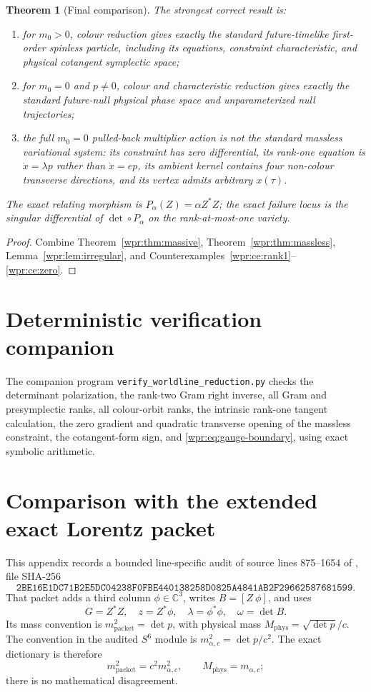 \documentclass[11pt]{article}
\newtheorem{theorem}{Theorem}[section]
\begin{document}
\begin{theorem}[Final comparison]
\label{wpr:thm:verdict}
The strongest correct result is:
\begin{enumerate}[label=\textup{(\arabic*)}]
\item for \(m_0>0\), colour reduction gives exactly the standard
future-timelike first-order spinless particle, including its equations,
constraint characteristic, and physical cotangent symplectic space;
\item for \(m_0=0\) and \(p\neq0\), colour and characteristic reduction
gives exactly the standard future-null physical phase space and
unparameterized null trajectories;
\item the full \(m_0=0\) pulled-back multiplier action is not the
standard massless variational system: its constraint has zero
differential, its rank-one equation is \(\dot x=\lambda p\) rather
than \(\dot x=e p\), its ambient kernel contains four non-colour
transverse directions, and its vertex admits arbitrary \(x(\tau)\).
\end{enumerate}
The exact relating morphism is \(P_\alpha(Z)=\alpha Z^*Z\); the exact
failure locus is the singular differential of
\(\det\circ P_\alpha\) on the rank-at-most-one variety.
\end{theorem}
\begin{proof}
Combine Theorem~\ref{wpr:thm:massive},
Theorem~\ref{wpr:thm:massless},
Lemma~\ref{wpr:lem:irregular}, and
Counterexamples~\ref{wpr:ce:rank1}--\ref{wpr:ce:zero}.
\end{proof}

\section{Deterministic verification companion}
The companion program
\texttt{verify\_worldline\_reduction.py} checks the determinant
polarization, the rank-two Gram right inverse, all Gram and
presymplectic ranks, all colour-orbit ranks, the intrinsic rank-one
tangent calculation, the zero gradient and quadratic transverse
opening of the massless constraint, the cotangent-form sign, and
\eqref{wpr:eq:gauge-boundary}, using exact symbolic arithmetic.

\appendix
\section{Comparison with the extended exact Lorentz packet}
\label{wpr:app:packet}

This appendix records a bounded line-specific audit of source lines
875--1654 of
, file SHA-256
\[
\texttt{2BE16E1DC71B2E5DC04238F0FBE440138258D0825A4841AB2F29662587681599}.
\]
That packet adds a third column \(\phi\in\mathbb C^3\), writes
\(B=[Z\ \phi]\), and uses
\[
 G=Z^*Z,\quad z=Z^*\phi,\quad
 \lambda=\phi^*\phi,\quad \omega=\det B.
\]
Its mass convention is \(m^2_{\mathrm{packet}}=\det p\), with physical
mass \(M_{\mathrm{phys}}=\sqrt{\det p}/c\).  The convention in the
audited \(S^6\) module is
\(m_{\alpha,c}^2=\det p/c^2\).  The exact dictionary is therefore
\[
 m^2_{\mathrm{packet}}=c^2m_{\alpha,c}^2,\qquad
 M_{\mathrm{phys}}=m_{\alpha,c};
\]
there is no mathematical disagreement.
\end{document}
